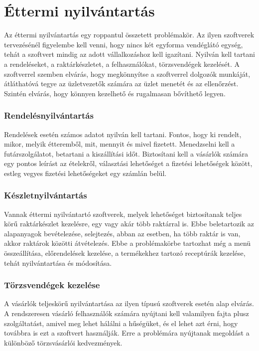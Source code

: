 \chapter{Éttermi nyilvántartás}

Az éttermi nyilvántartás egy roppantul összetett problémakör. Az ilyen szoftverek tervezésénél figyelembe kell venni, hogy nincs két egyforma vendéglátó egység, tehát a szoftvert mindig az adott vállalkozáshoz kell igazítani. Nyilván kell tartani a rendeléseket, a raktárkészletet, a felhasználókat, törzsvendégek kezelését. A szoftverrel szemben elvárás, hogy megkönnyítse a szoftverrel dolgozók munkáját, átláthatóvá tegye az üzletvezetők számára az üzlet menetét és az ellenőrzést. Szintén elvárás, hogy könnyen kezelhető és rugalmasan bővíthető legyen.

\subsection{Rendelésnyilvántartás}

Rendelések esetén számos adatot nyilván kell tartani. Fontos, hogy ki rendelt, mikor, melyik étteremből, mit, mennyit és mivel fizetett. Menedzselni kell a futárszolgálatot, betartani a kiszállítási időt. Biztosítani kell a vásárlók számára egy pontos leírást az ételekről, választási lehetőséget a fizetési lehetőségek között, estleg vegyes fizetési lehetőségeket egy számlán belül.

\subsection{Készletnyilvántartás}

Vannak éttermi nyilvántartó szoftverek, melyek lehetőséget biztosítanak teljes körű raktárkészlet kezelésre, egy vagy akár több raktárral is. Ebbe beletartozik az alapanyagok bevételezése, selejtezés, abban az esetben, ha több raktár is van, akkor raktárok közötti átvételezés.
Ebbe a problémakörbe tartozhat még a menü összeállítása, előrendelések kezelése, a termékekhez tartozó receptúrák kezelése, tehát nyilvántartása és módosítása.

\subsection{Törzsvendégek kezelése}

A vásárlók teljeskörű nyilvántartása az ilyen típusú szoftverek esetén alap elvárás. A rendszeresen vásárló felhasználók számára nyújtani kell valamilyen fajta plusz szolgáltatást, amivel meg lehet hálálni a hűségüket, és el lehet azt érni, hogy továbbra is ezt a szoftvert használják. Erre a problémára nyújtanak megoldást a különböző törzsvásárlói kedvezmények.

